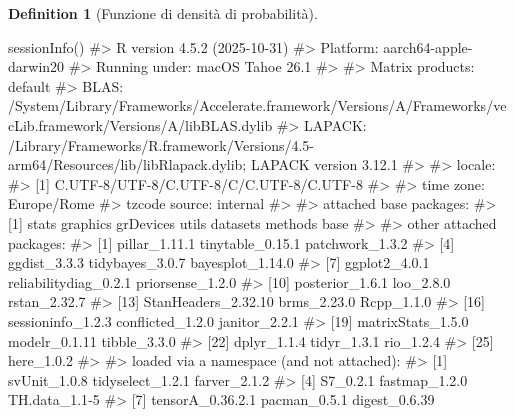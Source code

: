 \documentclass[
  letterpaper,
  DIV=11,
  numbers=noendperiod,
  oneside]{scrreprt}
\newenvironment{Shaded}{\begin{snugshade}}{\end{snugshade}}
\newcommand{\CommentTok}[1]{\textcolor[rgb]{0.37,0.37,0.37}{#1}}
\newcommand{\FunctionTok}[1]{\textcolor[rgb]{0.28,0.35,0.67}{#1}}
\newcommand{\NormalTok}[1]{\textcolor[rgb]{0.00,0.23,0.31}{#1}}
\theoremstyle{definition}
\theoremstyle{plain}
\theoremstyle{definition}
\newtheorem{definition}{Definition}[chapter]
\theoremstyle{remark}
\begin{document}
\begin{definition}[Funzione di densità di
probabilità]
\begin{tcolorbox}
\begin{Shaded}
\begin{Highlighting}[]
\FunctionTok{sessionInfo}\NormalTok{()}
\CommentTok{\#\textgreater{} R version 4.5.2 (2025{-}10{-}31)}
\CommentTok{\#\textgreater{} Platform: aarch64{-}apple{-}darwin20}
\CommentTok{\#\textgreater{} Running under: macOS Tahoe 26.1}
\CommentTok{\#\textgreater{} }
\CommentTok{\#\textgreater{} Matrix products: default}
\CommentTok{\#\textgreater{} BLAS:   /System/Library/Frameworks/Accelerate.framework/Versions/A/Frameworks/vecLib.framework/Versions/A/libBLAS.dylib }
\CommentTok{\#\textgreater{} LAPACK: /Library/Frameworks/R.framework/Versions/4.5{-}arm64/Resources/lib/libRlapack.dylib;  LAPACK version 3.12.1}
\CommentTok{\#\textgreater{} }
\CommentTok{\#\textgreater{} locale:}
\CommentTok{\#\textgreater{} [1] C.UTF{-}8/UTF{-}8/C.UTF{-}8/C/C.UTF{-}8/C.UTF{-}8}
\CommentTok{\#\textgreater{} }
\CommentTok{\#\textgreater{} time zone: Europe/Rome}
\CommentTok{\#\textgreater{} tzcode source: internal}
\CommentTok{\#\textgreater{} }
\CommentTok{\#\textgreater{} attached base packages:}
\CommentTok{\#\textgreater{} [1] stats     graphics  grDevices utils     datasets  methods   base     }
\CommentTok{\#\textgreater{} }
\CommentTok{\#\textgreater{} other attached packages:}
\CommentTok{\#\textgreater{}  [1] pillar\_1.11.1         tinytable\_0.15.1      patchwork\_1.3.2      }
\CommentTok{\#\textgreater{}  [4] ggdist\_3.3.3          tidybayes\_3.0.7       bayesplot\_1.14.0     }
\CommentTok{\#\textgreater{}  [7] ggplot2\_4.0.1         reliabilitydiag\_0.2.1 priorsense\_1.2.0     }
\CommentTok{\#\textgreater{} [10] posterior\_1.6.1       loo\_2.8.0             rstan\_2.32.7         }
\CommentTok{\#\textgreater{} [13] StanHeaders\_2.32.10   brms\_2.23.0           Rcpp\_1.1.0           }
\CommentTok{\#\textgreater{} [16] sessioninfo\_1.2.3     conflicted\_1.2.0      janitor\_2.2.1        }
\CommentTok{\#\textgreater{} [19] matrixStats\_1.5.0     modelr\_0.1.11         tibble\_3.3.0         }
\CommentTok{\#\textgreater{} [22] dplyr\_1.1.4           tidyr\_1.3.1           rio\_1.2.4            }
\CommentTok{\#\textgreater{} [25] here\_1.0.2           }
\CommentTok{\#\textgreater{} }
\CommentTok{\#\textgreater{} loaded via a namespace (and not attached):}
\CommentTok{\#\textgreater{}  [1] svUnit\_1.0.8          tidyselect\_1.2.1      farver\_2.1.2         }
\CommentTok{\#\textgreater{}  [4] S7\_0.2.1              fastmap\_1.2.0         TH.data\_1.1{-}5        }
\CommentTok{\#\textgreater{}  [7] tensorA\_0.36.2.1      pacman\_0.5.1          digest\_0.6.39        }

\end{Highlighting}
\end{Shaded}
\end{tcolorbox}
\end{definition}
\end{document}
